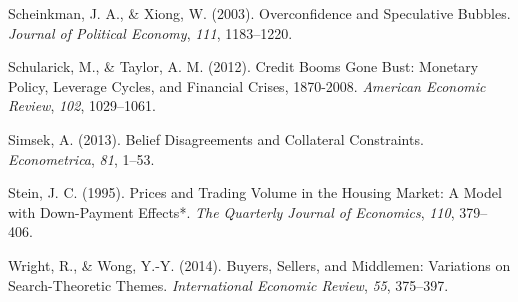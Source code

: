 \documentclass[
  12pt,
]{article}
\newlength{\cslhangindent}
\newlength{\cslentryspacingunit} %
\newenvironment{CSLReferences}[2] %
 {%
  \setlength{\parindent}{0pt}
  \ifodd #1
  \let\oldpar\par
  \def\par{\hangindent=\cslhangindent\oldpar}
  \fi
  \setlength{\parskip}{#2\cslentryspacingunit}
 }%
 {}
\begin{document}
\begin{CSLReferences}{1}{0}
\leavevmode{}%
Scheinkman, J. A., \& Xiong, W. (2003). Overconfidence and {Speculative Bubbles}. \emph{Journal of Political Economy}, \emph{111}, 1183--1220.

\leavevmode{}%
Schularick, M., \& Taylor, A. M. (2012). Credit {Booms Gone Bust}: {Monetary Policy}, {Leverage Cycles}, and {Financial Crises}, 1870-2008. \emph{American Economic Review}, \emph{102}, 1029--1061.

\leavevmode{}%
Simsek, A. (2013). Belief {Disagreements} and {Collateral Constraints}. \emph{Econometrica}, \emph{81}, 1--53.

\leavevmode{}%
Stein, J. C. (1995). Prices and {Trading Volume} in the {Housing Market}: {A Model} with {Down}-{Payment Effects}*. \emph{The Quarterly Journal of Economics}, \emph{110}, 379--406.

\leavevmode{}%
Wright, R., \& Wong, Y.-Y. (2014). Buyers, {Sellers}, and {Middlemen}: {Variations} on {Search}-{Theoretic Themes}. \emph{International Economic Review}, \emph{55}, 375--397.

\end{CSLReferences}
\end{document}
